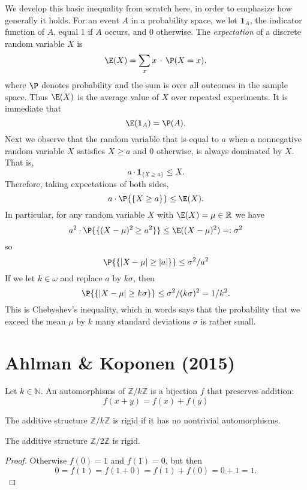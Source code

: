 We develop this basic inequality from scratch here, in order to emphasize how generally it holds. For an event $A$ in a probability space, we let $\mathbf 1_A$, the indicator function of $A$, equal 1 if $A$ occurs, and $0$ otherwise. The \emph{expectation} of a discrete random variable $X$ is 
\[
\E(X)=\sum_x x\,\cdot\,\P(X=x).
\]
where $\P$ denotes probability and the sum is over all outcomes in the sample space. Thus $\E(X)$ is the average value of $X$ over repeated experiments. It is immediate that
\[
\E (\mathbf 1_{A}) = \P(A).
\]
Next we observe that the random variable that is equal to $a$ when a nonnegative random variable $X$ satisfies $X\ge a$ and $0$ otherwise, is always dominated by $X$. That is, 
\[
a\cdot \mathbf 1_{\{X\ge a\}} \le X.
\]
Therefore, taking expectations of both sides,
\[
a\cdot \P{\{X\ge a\}} \le \E(X).
\]
In particular, for any random variable $X$ with $\E(X)=\mu\in\mathbb R$ we have 
\[
a^2\cdot \P{\{(X-\mu)^2\ge a^2\}} \le \E ((X-\mu)^2)=:\sigma^2
\]
so
\[
\P{\{|X-\mu|\ge |a|\}} \le \sigma^2/a^2
\]
If we let $k\in\omega$ and replace $a$ by $k\sigma$, then
\[
\P{\{|X-\mu|\ge k\sigma\}} \le \sigma^2/(k\sigma)^2 = 1/k^2.
\]
This is Chebyshev's inequality, which in words says that the probability that we exceed the mean $\mu$ by $k$ many standard deviations $\sigma$ is rather small.

\chapter{Ahlman \& Koponen (2015)}
\begin{definition}
	\label{def:auto}
	\leanok
	Let $k\in\mathbb N$.
	An automorphisms of $\mathbb Z/ k\mathbb Z$ is a bijection $f$ that preserves addition:
	\[
	f(x+y)=f(x)+f(y)
	\]
\end{definition}
\begin{definition}
	\label{def:rigid}
	\leanok
	The additive structure $\mathbb Z/ k\mathbb Z$ is rigid if it has no nontrivial automorphisms.
\end{definition}


\begin{theorem}
	\label{thm:rigid}
	\leanok
	The additive structure $\mathbb Z/ 2\mathbb Z$ is rigid.
\end{theorem}
\begin{proof}
	Otherwise $f(0)=1$ and $f(1)=0$, but then
	\[
	0=f(1)=f(1+0)=f(1)+f(0)=0+1=1.
	\]
\end{proof}


